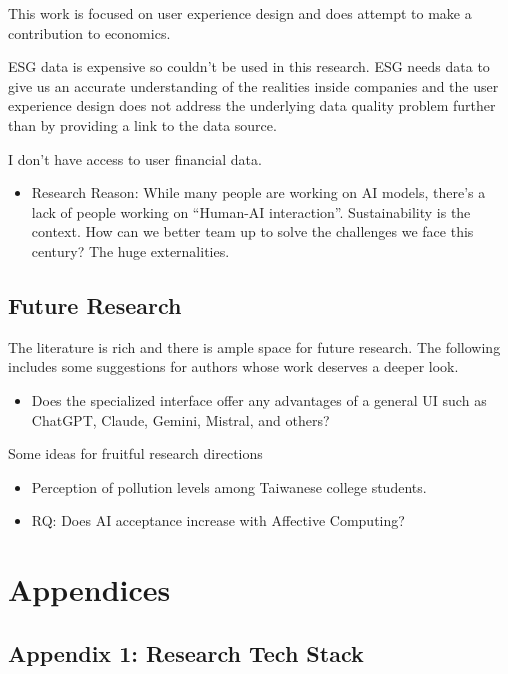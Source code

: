 \documentclass[
  letterpaper,
  DIV=11,
  numbers=noendperiod]{scrartcl}
\providecommand{\tightlist}{%
  \setlength{\itemsep}{0pt}\setlength{\parskip}{0pt}}\usepackage{longtable,booktabs,array}
\begin{document}
This work is focused on user experience design and does attempt to make
a contribution to economics.

ESG data is expensive so couldn't be used in this research. ESG needs
data to give us an accurate understanding of the realities inside
companies and the user experience design does not address the underlying
data quality problem further than by providing a link to the data
source.

I don't have access to user financial data.

\begin{itemize}
\tightlist
\item
  Research Reason: While many people are working on AI models, there's a
  lack of people working on ``Human-AI interaction''. Sustainability is
  the context. How can we better team up to solve the challenges we face
  this century? The huge externalities.
\end{itemize}

\subsection{Future Research}\label{future-research}

The literature is rich and there is ample space for future research. The
following includes some suggestions for authors whose work deserves a
deeper look.

\begin{itemize}
\tightlist
\item
  Does the specialized interface offer any advantages of a general UI
  such as ChatGPT, Claude, Gemini, Mistral, and others?
\end{itemize}

Some ideas for fruitful research directions

\begin{itemize}
\item
  Perception of pollution levels among Taiwanese college students.
\item
  RQ: Does AI acceptance increase with Affective Computing?
\end{itemize}

\newpage

\section{Appendices}\label{appendices}

\subsection{Appendix 1: Research Tech
Stack}\label{appendix-1-research-tech-stack}
\end{document}

